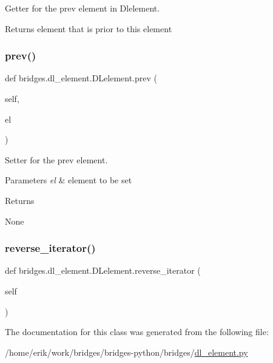 Getter for the prev element in Dlelement. 

\begin{DoxyReturn}{Returns}
element that is prior to this element 
\end{DoxyReturn}
\mbox{\label{classbridges_1_1dl__element_1_1_d_lelement_a17c371ec0c38e9555e55551d9be4d185}} 
\subsubsection{\texorpdfstring{prev()}{prev()}\hspace{0.1cm}{\footnotesize\ttfamily [2/2]}}
{\footnotesize\ttfamily def bridges.\+dl\+\_\+element.\+D\+Lelement.\+prev (\begin{DoxyParamCaption}\item[{}]{self,  }\item[{}]{el }\end{DoxyParamCaption})}



Setter for the prev element. 


\begin{DoxyParams}{Parameters}
{\em el} & element to be set\\
\hline
\end{DoxyParams}
\begin{DoxyReturn}{Returns}


None 
\end{DoxyReturn}
\mbox{\label{classbridges_1_1dl__element_1_1_d_lelement_a2baa040819283ef3adcda70b630de421}} 
\subsubsection{\texorpdfstring{reverse\+\_\+iterator()}{reverse\_iterator()}}
{\footnotesize\ttfamily def bridges.\+dl\+\_\+element.\+D\+Lelement.\+reverse\+\_\+iterator (\begin{DoxyParamCaption}\item[{}]{self }\end{DoxyParamCaption})}



The documentation for this class was generated from the following file\+:\begin{DoxyCompactItemize}
\item 
/home/erik/work/bridges/bridges-\/python/bridges/\hyperlink{dl__element_8py}{dl\+\_\+element.\+py}\end{DoxyCompactItemize}
